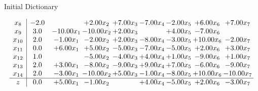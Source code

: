 \documentclass[8pt]{article}
\begin{document}
Initial Dictionary 

\[\begin{array}{c| c c@{\hskip 2pt} c@{\hskip 2pt} c@{\hskip 2pt} c@{\hskip 2pt} c@{\hskip 2pt} c@{\hskip 2pt} c@{\hskip 2pt} }
 x_{8}   &  -2.0  &   & +  2.00 x_{2} & +  7.00 x_{3} & -7.00 x_{4} & -2.00 x_{5} & +  6.00 x_{6} & +  7.00 x_{7}\\
 x_{9}   &  3.0 & -10.00 x_{1} & -10.00 x_{2} & +  2.00 x_{3} &   & +  4.00 x_{5} & -7.00 x_{6} &   \\
 x_{10}   &  2.0 & -1.00 x_{1} & -2.00 x_{2} & +  2.00 x_{3} & -8.00 x_{4} & -3.00 x_{5} & + 10.00 x_{6} & -2.00 x_{7}\\
 x_{11}   &  0.0 & +  6.00 x_{1} & +  5.00 x_{2} & -5.00 x_{3} & -7.00 x_{4} & -5.00 x_{5} & +  2.00 x_{6} & +  3.00 x_{7}\\
 x_{12}   &  1.0  &   & -5.00 x_{2} & -4.00 x_{3} & +  4.00 x_{4} & +  1.00 x_{5} & -9.00 x_{6} & +  1.00 x_{7}\\
 x_{13}   &  2.0 & +  3.00 x_{1} & -8.00 x_{2} & -9.00 x_{3} & +  9.00 x_{4} & +  7.00 x_{5} & -6.00 x_{6} & -9.00 x_{7}\\
 x_{14}   &  2.0 & -3.00 x_{1} & -10.00 x_{2} & +  5.00 x_{3} & -1.00 x_{4} & -8.00 x_{5} & + 10.00 x_{6} & -10.00 x_{7}\\
\hline
z    &  0.0 & +  5.00 x_{1} & -1.00 x_{2} &   & +  4.00 x_{4} & -5.00 x_{5} & +  2.00 x_{6} & -3.00 x_{7}\\
\end{array}\]
\end{document}
